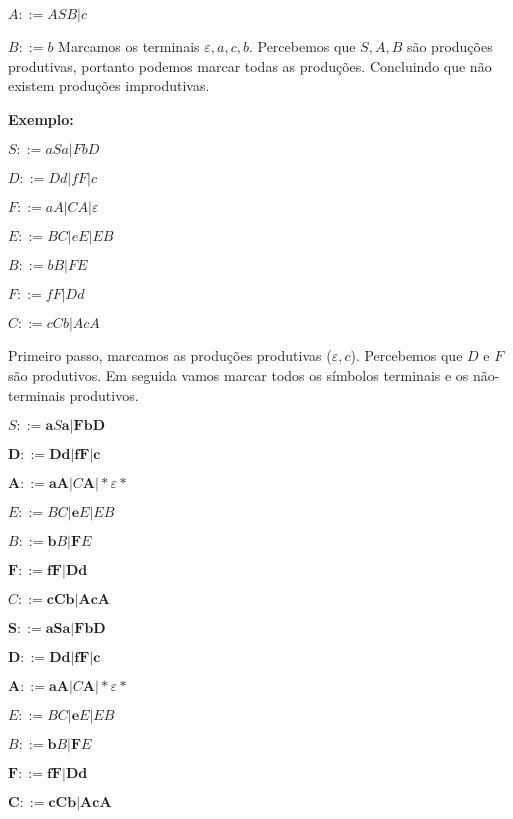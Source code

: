 \documentclass[]{article}
\begin{document}
	$A::= ASB | c$
	
	$B::= b$
	Marcamos os terminais $\varepsilon, a,c,b$. Percebemos que $S, A, B$ são produções produtivas, portanto podemos marcar todas as produções. Concluindo que não existem produções improdutivas.
	
	\textbf{Exemplo:}
	
	$S::=aSa | FbD$
	
	$D::= Dd |fF|c$
	
	$F::=aA|CA|\varepsilon$
	
	$E ::= BC | eE | EB$
	
	$B ::= bB | FE$
	
	$F ::= fF | Dd$
	
	$C ::= cCb | AcA$
	
	Primeiro passo, marcamos as produções produtivas ($\varepsilon, c$). Percebemos que $D$ e $F$ são produtivos. Em seguida vamos marcar todos os símbolos terminais e os não-terminais produtivos.
	
	\begin{minipage}[t]{0.43\textwidth}
	$S::=\textbf{a}S\textbf{a} | \textbf{F}\textbf{b}\textbf{D}$
	
	$\textbf{D}::= \textbf{D}\textbf{d} |\textbf{f}\textbf{F}|\textbf{c}$
	
	$\textbf{A}::=\textbf{a}\textbf{A}|C\textbf{A}|*\varepsilon*$
	
	$E ::= BC | \textbf{e}E | EB$
	
	$B ::= \textbf{b}B | \textbf{F}E$
	
	$\textbf{F} ::= \textbf{f}\textbf{F} | \textbf{D}\textbf{d}$
	
	$C ::= \textbf{c}\textbf{C}\textbf{b} | \textbf{A}\textbf{c}\textbf{A}$
	\end{minipage}
	
	\hfill
	
	\begin{minipage}[t]{0.43\textwidth}
	$\textbf{S}::=\textbf{a}\textbf{S}\textbf{a} | \textbf{F}\textbf{b}\textbf{D}$
	
	$\textbf{D}::= \textbf{D}\textbf{d} |\textbf{f}\textbf{F}|\textbf{c}$
	
	$\textbf{A}::=\textbf{a}\textbf{A}|C\textbf{A}|*\varepsilon*$
	
	$E ::= BC | \textbf{e}E | EB$
	
	$B ::= \textbf{b}B | \textbf{F}E$
	
	$\textbf{F} ::= \textbf{f}\textbf{F} | \textbf{D}\textbf{d}$
	
	$\textbf{C} ::= \textbf{c}\textbf{Cb} | \textbf{A}\textbf{c}\textbf{A}$
	\end{minipage}
	
\end{document}
